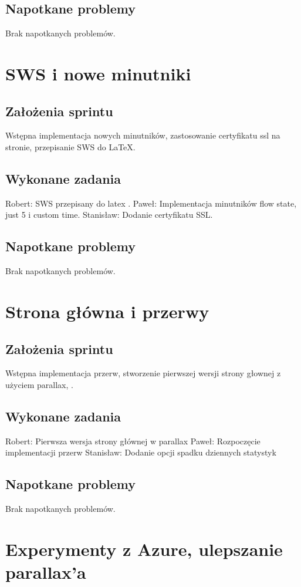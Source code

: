 \documentclass[a4paper,11pt]{report}
\begin{document}
\subsection {Napotkane problemy}
Brak napotkanych problemów.

\section {SWS i nowe minutniki}
\subsection {Założenia sprintu}
Wstępna implementacja nowych minutników, zastosowanie certyfikatu ssl na stronie, przepisanie SWS do LaTeX.
\subsection {Wykonane zadania}
Robert: SWS przepisany do latex .
Paweł: Implementacja minutników flow state, just 5 i custom time.  
Stanisław: Dodanie certyfikatu SSL.  
\subsection {Napotkane problemy}
Brak napotkanych problemów.

\section {Strona główna i przerwy}
\subsection {Założenia sprintu}
Wstępna implementacja przerw, stworzenie pierwszej wersji strony głownej z użyciem parallax, .
\subsection {Wykonane zadania}
Robert: Pierwsza wersja strony głównej w parallax 
Paweł: Rozpoczęcie implementacji przerw 
Stanisław: Dodanie opcji spadku dziennych statystyk  
\subsection {Napotkane problemy}
Brak napotkanych problemów.

\section {Experymenty z Azure, ulepszanie parallax'a}
\end{document}
